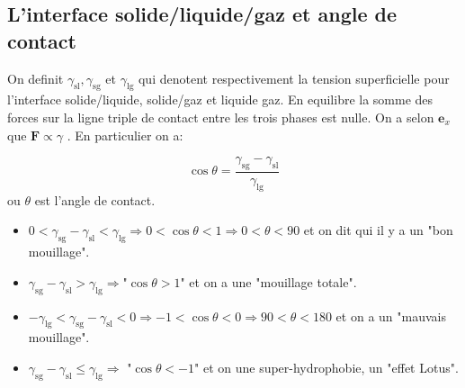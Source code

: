 \subsection{L'interface solide/liquide/gaz et angle de contact} 

On definit $\gamma _{\mathrm{sl}},\gamma _{\mathrm{sg}}$ et $\gamma _{\mathrm{lg}}$ qui denotent respectivement la tension superficielle pour l'interface solide/liquide, solide/gaz et liquide gaz. En equilibre la somme des forces sur la ligne triple de contact entre les trois phases est nulle. On a selon $\boldsymbol{e}_{x}$ que $\boldsymbol{F}\propto\gamma$ . En particulier on a:
\begin{theorem}
$$
\cos \theta=\frac{\gamma _{\mathrm{sg}}-\gamma _{\mathrm{sl}}}{\gamma _{\mathrm{lg}}}
$$
ou $\theta$ est l'angle de contact.
\begin{itemize}
\item $0<\gamma _{\mathrm{sg}}-\gamma _{\mathrm{sl}}<\gamma _{\mathrm{lg}}\Rightarrow0<\cos \theta<1\Rightarrow0<\theta<90$ et on dit qui il y a un "bon mouillage".
\item $\gamma _{\mathrm{sg}}-\gamma _{\mathrm{sl}}>\gamma _{\mathrm{lg}}\Rightarrow$"$\cos \theta>1$" et on a une "mouillage totale".
\item $-\gamma _{\mathrm{lg}}<\gamma _{\mathrm{sg}}-\gamma _{\mathrm{sl}}<0\Rightarrow-1<\cos \theta<0\Rightarrow90<\theta<180$ et on a un "mauvais mouillage".
\item $\gamma _{\mathrm{sg}}-\gamma _{\mathrm{sl}}\leq\gamma _{\mathrm{lg}}\Rightarrow$ "$\cos \theta<-1$" et on une super-hydrophobie, un "effet Lotus".
\end{itemize}
\end{theorem}
